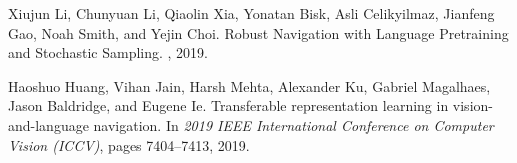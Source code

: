 \documentclass[10pt,twocolumn,letterpaper]{article}
\begin{document}
\begin{thebibliography}{10}
	Xiujun {Li}, Chunyuan {Li}, Qiaolin {Xia}, Yonatan {Bisk}, Asli
	{Celikyilmaz}, Jianfeng {Gao}, Noah {Smith}, and Yejin {Choi}.
	\newblock Robust Navigation with Language Pretraining and Stochastic Sampling.
	, 2019.
	
	Haoshuo {Huang}, Vihan {Jain}, Harsh {Mehta}, Alexander {Ku}, Gabriel
	{Magalhaes}, Jason {Baldridge}, and Eugene {Ie}.
	\newblock Transferable representation learning in vision-and-language navigation.
	\newblock In {\em 2019 IEEE International Conference on Computer Vision (ICCV)}, pages 7404--7413, 2019.
	
\end{thebibliography}
\end{document}
